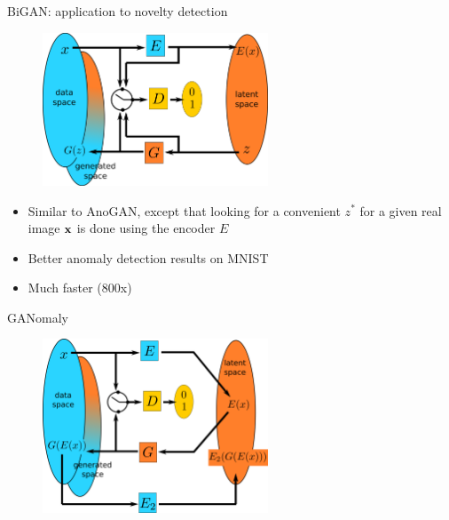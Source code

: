 \documentclass[xcolor=pdftex,dvipsnames,table,mathserif]{beamer}
\begin{document}
\begin{frame}{BiGAN: application to novelty detection \cite{zenati_efficient_2018}}

  \begin{figure}[ht]
    \centering
    \includegraphics[width=0.6\textwidth]{bigan}
  \end{figure}

  \begin{itemize}
  \item Similar to AnoGAN, except that looking for a convenient $z^*$ for a given real image $\mathbf{x}$ is done using the encoder $E$
  \item Better anomaly detection results on MNIST
  \item Much faster (800x)
  \end{itemize}


\end{frame}



\begin{frame}{GANomaly \cite{akcay_ganomaly:_2019}}

  \begin{figure}[ht]
    \centering
    \includegraphics[width=0.6\textwidth]{ganomaly}
  \end{figure}



\end{frame}
\end{document}
